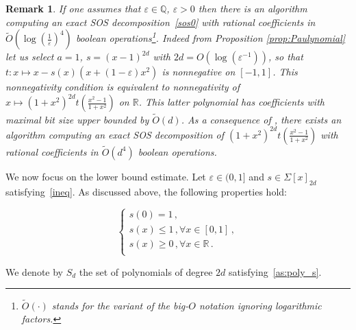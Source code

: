 \documentclass[a4paper,12pt]{article}
\newcommand{\R}{\mathbb{R}} %
\newtheorem{remark}{Remark}
\newcommand{\RR}{\mathbb{R}}
\begin{document}
\begin{remark}
If one assumes that $\varepsilon \in \mathbb{Q}$, $\varepsilon>0$ then there is an algorithm computing an exact SOS decomposition~\eqref{sos0} with rational coefficients in  $\tilde{O}\left(\log(\frac{1}{\varepsilon})^4\right)$ {boolean operations}\footnote{$\tilde{O}(\cdot)$ stands for the variant of the big-$O$ notation ignoring logarithmic factors.}. 
Indeed from Proposition \ref{prop:Paulynomial} let us select $a=1$, $s = (x-1)^{2d}$ with $2 d = O\left( \log(\varepsilon^{-1}) \right)$, so that $t : x \mapsto x - s(x) (x + (1-\varepsilon) x^2)$ is nonnegative on $[-1, 1]$. 
This nonnegativity condition is equivalent to nonnegativity of $x \mapsto (1+x^2)^{2 d} t\left(\frac{x^2-1}{1 + x^2}\right)$ on $\R$. 
This latter polynomial has coefficients with maximal bit size upper bounded by $\tilde{O}(d)$. 
As a consequence of \cite[Theorem~24]{mag19}, there exists an algorithm  computing an exact SOS decomposition of $(1+x^2)^{2 d} t\left(\frac{x^2-1}{1 + x^2}\right)$ with rational coefficients in $\tilde{O}(d^4)$ {boolean operations}. 
\end{remark}

We now focus on the {lower} bound estimate. 
Let $\varepsilon \in (0,1]$ and $s \in \Sigma[x]_{2d}$  satisfying~\eqref{ineq}.
As discussed above, the following properties hold:

\begin{equation}\label{as:poly_s}
	\begin{cases}
	s(0) = 1 \,, \\
	s(x) \leq 1 \,, \forall x \in [0,1] \,,\\
	s(x) \geq 0 \,, \forall x \in \RR \,. \\
	\end{cases}
\end{equation}

We denote by $S_d$ the set of polynomials of degree $2d$
satisfying~\eqref{as:poly_s}.
\end{document}
